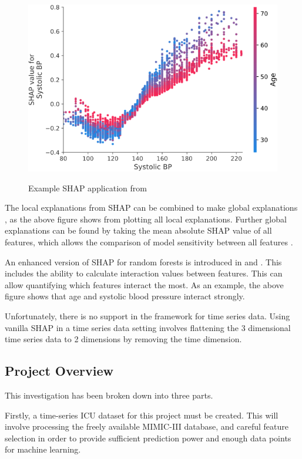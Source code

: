 \documentclass[12pt]{article}
\begin{document}
\begin{figure}[H]
\centering\caption{Example SHAP application from \cite{SHAPInteraction}}
\includegraphics[scale=0.7]{SHAP example.png}
\label{SHAP Example Systolic BP}
\end{figure}
The local explanations from SHAP can be combined to make global explanations \cite{TreeExplainer}, as the above figure shows from plotting all local explanations. Further global explanations can be found by taking the mean absolute SHAP value of all features, which allows the comparison of model sensitivity between all features \cite{molnar2019}.

An enhanced version of SHAP for random forests is introduced in \cite{TreeExplainer} and \cite{SHAPInteraction}. This includes the ability to calculate interaction values between features. This can allow quantifying which features interact the most. As an example, the above figure shows that age and systolic blood pressure interact strongly.

Unfortunately, there is no support in the framework for time series data. Using vanilla SHAP in a time series data setting involves flattening the 3 dimensional time series data to 2 dimensions by removing the time dimension. 

\subsection{Project Overview}

This investigation has been broken down into three parts. 

Firstly, a time-series ICU dataset for this project must be created. This will involve processing the freely available MIMIC-III database, and careful feature selection in order to provide sufficient prediction power and enough data points for machine learning. 
\end{document}
